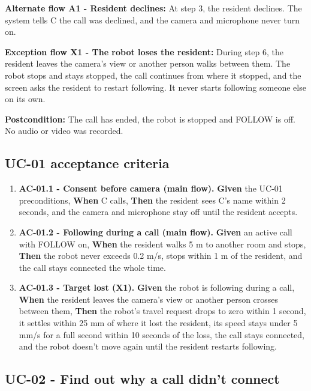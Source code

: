 \documentclass[12pt,letterpaper]{article}
\begin{document}
\textbf{Alternate flow A1 - Resident declines:} At step 3, the resident declines. The system tells C the call was declined, and the camera and microphone never turn on.

\textbf{Exception flow X1 - The robot loses the resident:} During step 6, the resident leaves the camera's view or another person walks between them. The robot stops and stays stopped, the call continues from where it stopped, and the screen asks the resident to restart following. It never starts following someone else on its own.

\textbf{Postcondition:} The call has ended, the robot is stopped and FOLLOW is off. No audio or video was recorded.

\subsection*{UC-01 acceptance criteria}

\begin{enumerate}\setlength{\itemsep}{2pt}

\item \textbf{AC-01.1 - Consent before camera (main flow).} \textbf{Given} the UC-01 preconditions, \textbf{When} C calls, \textbf{Then} the resident sees C's name within 2 seconds, and the camera and microphone stay off until the resident accepts.

\item \textbf{AC-01.2 - Following during a call (main flow).} \textbf{Given} an active call with FOLLOW on, \textbf{When} the resident walks 5 m to another room and stops, \textbf{Then} the robot never exceeds 0.2 m/s, stops within 1 m of the resident, and the call stays connected the whole time.

\item \textbf{AC-01.3 - Target lost (X1).} \textbf{Given} the robot is following during a call, \textbf{When} the resident leaves the camera's view or another person crosses between them, \textbf{Then} the robot's travel request drops to zero within 1 second, it settles within 25 mm of where it lost the resident, its speed stays under 5 mm/s for a full second within 10 seconds of the loss, the call stays connected, and the robot doesn't move again until the resident restarts following.

\end{enumerate}

\clearpage

\subsection*{UC-02 - Find out why a call didn't connect}
\end{document}
